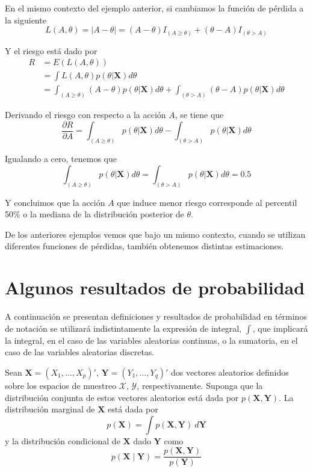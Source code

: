 \begin{Eje}
En el mismo contexto del ejemplo anterior, si cambiamos la función de pérdida a la siguiente
\begin{equation*}
L(A,\theta)=|A-\theta|=(A-\theta)I_{(A\geq\theta)}+(\theta-A)I_{(\theta>A)}
\end{equation*}

Y el riesgo está dado por
\begin{align*}
R&=E(L(A,\theta))\\
&=\int L(A,\theta)p(\theta|\mathbf{X})d\theta\\
&=\int_{(A\geq\theta)}(A-\theta)p(\theta|\mathbf{X})d\theta+\int_{(\theta>A)}(\theta-A)p(\theta|\mathbf{X})d\theta
\end{align*}

Derivando el riesgo con respecto a la acción $A$, se tiene que
\begin{equation*}
\frac{\partial R}{\partial A}=\int_{(A\geq\theta)}p(\theta|\mathbf{X})d\theta-\int_{(\theta>A)}p(\theta|\mathbf{X})d\theta
\end{equation*}

Igualando a cero, tenemos que
\begin{equation*}
\int_{(A\geq\theta)}p(\theta|\mathbf{X})d\theta=\int_{(\theta>A)}p(\theta|\mathbf{X})d\theta=0.5
\end{equation*}

Y concluimos que la acción $A$ que induce menor riesgo corresponde al percentil 50\% o la mediana de la distribución posterior de $\theta$.
\end{Eje}

De los anteriores ejemplos vemos que bajo un mismo contexto, cuando se utilizan diferentes funciones de pérdidas, también obtenemos distintas estimaciones.

\section{Algunos resultados de probabilidad}

A continuación se presentan definiciones y resultados de probabilidad en términos de notación se utilizará indistintamente la expresión de integral, $\int$, que implicará la integral, en el caso de las variables aleatorias continuas, o la sumatoria, en el caso de las variables aleatorias discretas.

\begin{Defi}
Sean $\mathbf{X}=(X_1,\ldots,X_p)'$, $\mathbf{Y}=(Y_1,\ldots,Y_q)'$ dos vectores aleatorios definidos sobre los espacios de  muestreo $\mathcal{X}$, $\mathcal{Y}$, respectivamente. Suponga que la distribución conjunta de estos vectores aleatorios está dada por $p(\mathbf{X},\mathbf{Y})$. La distribución marginal de $\mathbf{X}$ está dada por
\begin{equation}
p(\mathbf{X})=\int p(\mathbf{X},\mathbf{Y})\ d\mathbf{Y}
\end{equation}
y la distribución condicional de $\mathbf{X}$ dado $\mathbf{Y}$ como
\begin{equation}
p(\mathbf{X} \mid \mathbf{Y})
=\frac{p(\mathbf{X},\mathbf{Y})}{p(\mathbf{Y})}
\end{equation}
\end{Defi}

